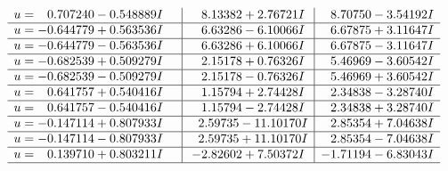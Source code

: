 \documentclass[1p]{elsarticle_modified}
\theoremstyle{definition}
\begin{document}
$$\begin{array}{c|c|c}
\begin{aligned}
u &= \phantom{-}0.707240 - 0.548889 I\end{aligned}
 & \phantom{-}8.13382 + 2.76721 I & \phantom{-}8.70750 - 3.54192 I \\ \hline\begin{aligned}
u &= -0.644779 + 0.563536 I\end{aligned}
 & \phantom{-}6.63286 - 6.10066 I & \phantom{-}6.67875 + 3.11647 I \\ \hline\begin{aligned}
u &= -0.644779 - 0.563536 I\end{aligned}
 & \phantom{-}6.63286 + 6.10066 I & \phantom{-}6.67875 - 3.11647 I \\ \hline\begin{aligned}
u &= -0.682539 + 0.509279 I\end{aligned}
 & \phantom{-}2.15178 + 0.76326 I & \phantom{-}5.46969 - 3.60542 I \\ \hline\begin{aligned}
u &= -0.682539 - 0.509279 I\end{aligned}
 & \phantom{-}2.15178 - 0.76326 I & \phantom{-}5.46969 + 3.60542 I \\ \hline\begin{aligned}
u &= \phantom{-}0.641757 + 0.540416 I\end{aligned}
 & \phantom{-}1.15794 + 2.74428 I & \phantom{-}2.34838 - 3.28740 I \\ \hline\begin{aligned}
u &= \phantom{-}0.641757 - 0.540416 I\end{aligned}
 & \phantom{-}1.15794 - 2.74428 I & \phantom{-}2.34838 + 3.28740 I \\ \hline\begin{aligned}
u &= -0.147114 + 0.807933 I\end{aligned}
 & \phantom{-}2.59735 - 11.10170 I & \phantom{-}2.85354 + 7.04638 I \\ \hline\begin{aligned}
u &= -0.147114 - 0.807933 I\end{aligned}
 & \phantom{-}2.59735 + 11.10170 I & \phantom{-}2.85354 - 7.04638 I \\ \hline\begin{aligned}
u &= \phantom{-}0.139710 + 0.803211 I\end{aligned}
 & -2.82602 + 7.50372 I & -1.71194 - 6.83043 I\\
 \hline 
 \end{array}$$\newpage$$\begin{array}{c|c|c}  

\end{array}$$
\end{document}
